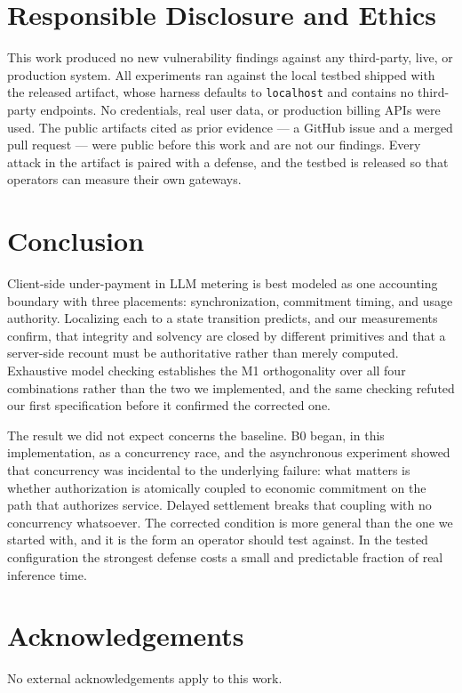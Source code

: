 \documentclass[preprint,3p,authoryear,12pt]{elsarticle}
\begin{document}
\section{Responsible Disclosure and Ethics}
This work produced no new vulnerability findings against any third-party, live, or
production system. All experiments ran against the local testbed shipped with the
released artifact, whose harness defaults to \texttt{localhost} and contains no
third-party endpoints. No credentials, real user data, or production billing APIs were
used. The public artifacts cited as prior evidence --- a GitHub issue \citep{newapi5235}
and a merged pull request \citep{aperture247} --- were public before this work and are
not our findings. Every attack in the artifact is paired with a defense, and the testbed
is released so that operators can measure their own gateways.

\section{Conclusion}
Client-side under-payment in LLM metering is best modeled as one accounting boundary
with three placements: synchronization, commitment timing, and usage authority.
Localizing each to a state transition predicts, and our measurements confirm, that
integrity and solvency are closed by different primitives and that a server-side recount
must be authoritative rather than merely computed. Exhaustive model checking establishes
the M1 orthogonality over all four combinations rather than the two we implemented, and
the same checking refuted our first specification before it confirmed the corrected one.

The result we did not expect concerns the baseline. B0 began, in this implementation, as
a concurrency race, and the asynchronous experiment showed that concurrency was
incidental to the underlying failure: what matters is whether authorization is
atomically coupled to economic commitment on the path that authorizes service. Delayed
settlement breaks that coupling with no concurrency whatsoever. The corrected condition
is more general than the one we started with, and it is the form an operator should test
against. In the tested configuration the strongest defense costs a small and predictable
fraction of real inference time.

\section*{Acknowledgements}
No external acknowledgements apply to this work.
\end{document}
